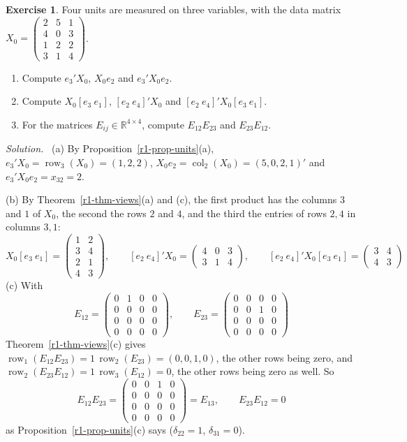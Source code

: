 \documentclass[12pt]{article}
\newcommand{\R}{\mathbb R}
\DeclareMathOperator{\row}{row}
\DeclareMathOperator{\col}{col}
\theoremstyle{definition}
\newtheorem{exercise}{Exercise}
\newenvironment{solution}{\par\noindent\textit{Solution.}\ }{\par\smallskip}
\begin{document}
\begin{exercise}\label{r1-dr-units}
Four units are measured on three variables, with the data matrix
\(X_0=\begin{pmatrix}2&5&1\\4&0&3\\1&2&2\\3&1&4\end{pmatrix}\).
\begin{enumerate}
\item Compute \(e_3'X_0\), \(X_0e_2\) and \(e_3'X_0e_2\).
\item Compute \(X_0[e_3\ e_1]\), \([e_2\ e_4]'X_0\) and \([e_2\ e_4]'X_0[e_3\ e_1]\).
\item For the matrices \(E_{ij}\in\R^{4\times4}\), compute \(E_{12}E_{23}\) and \(E_{23}E_{12}\).
\end{enumerate}
\end{exercise}
\begin{solution}
(a) By Proposition~\ref{r1-prop-units}(a), \(e_3'X_0=\row_3(X_0)=(1,2,2)\), \(X_0e_2=\col_2(X_0)=(5,0,2,1)'\) and
\(e_3'X_0e_2=x_{32}=2\).

(b) By Theorem~\ref{r1-thm-views}(a) and (c), the first product has the columns \(3\) and \(1\) of \(X_0\), the second
the rows \(2\) and \(4\), and the third the entries of rows \(2,4\) in columns \(3,1\):
\[
X_0[e_3\ e_1]=\begin{pmatrix}1&2\\3&4\\2&1\\4&3\end{pmatrix},\qquad
[e_2\ e_4]'X_0=\begin{pmatrix}4&0&3\\3&1&4\end{pmatrix},\qquad
[e_2\ e_4]'X_0[e_3\ e_1]=\begin{pmatrix}3&4\\4&3\end{pmatrix}
\]
(c) With
\[
E_{12}=\begin{pmatrix}0&1&0&0\\0&0&0&0\\0&0&0&0\\0&0&0&0\end{pmatrix},\qquad
E_{23}=\begin{pmatrix}0&0&0&0\\0&0&1&0\\0&0&0&0\\0&0&0&0\end{pmatrix}
\]
Theorem~\ref{r1-thm-views}(c) gives \(\row_1(E_{12}E_{23})=1\,\row_2(E_{23})=(0,0,1,0)\), the other rows being zero,
and \(\row_2(E_{23}E_{12})=1\,\row_3(E_{12})=0\), the other rows being zero as well. So
\[
E_{12}E_{23}=\begin{pmatrix}0&0&1&0\\0&0&0&0\\0&0&0&0\\0&0&0&0\end{pmatrix}=E_{13},\qquad E_{23}E_{12}=0
\]
as Proposition~\ref{r1-prop-units}(c) says (\(\delta_{22}=1\), \(\delta_{31}=0\)).
\end{solution}
\end{document}
